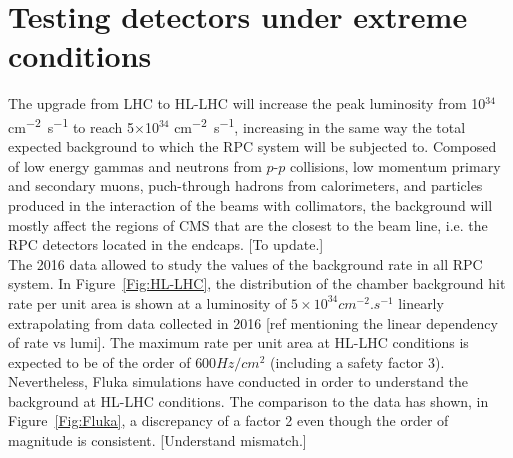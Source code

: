 \section{Testing detectors under extreme conditions}
\label{chapt4:sec:extreme}
	
	The upgrade from LHC to HL-LHC will increase the peak luminosity from 10$^{34}$ \si{cm^{-2}.s^{-1}} to reach 5$\times$10$^{34}$ \si{cm^{-2}.s^{-1}}, increasing in the same way the total expected background to which the RPC system will be subjected to.
	Composed of low energy gammas and neutrons from $p$-$p$ collisions, low momentum primary and secondary muons, puch-through hadrons from calorimeters, and particles produced in the interaction of the beams with collimators, the background will mostly affect the regions of CMS that are the closest to the beam line, i.e. the RPC detectors located in the endcaps. {\color{blue} [To update.]}\\
	
    The 2016 data allowed to study the values of the background rate in all RPC system.
	In Figure~\ref{Fig:HL-LHC}, the distribution of the chamber background hit rate per unit area is shown at a luminosity of $5\times10^{34}cm^{-2}.s^{-1}$ linearly extrapolating from data collected in 2016 {\color{blue} [ref mentioning the linear dependency of rate vs lumi]}.
	The maximum rate per unit area at HL-LHC conditions is expected to be of the order of ${600}{Hz/cm^2}$ (including a safety factor 3).
	Nevertheless, Fluka simulations have conducted in order to understand the background at HL-LHC conditions.
	The comparison to the data has shown, in Figure~\ref{Fig:Fluka}, a discrepancy of a factor 2 even though the order of magnitude is consistent. {\color{blue} [Understand mismatch.]}\\
    
